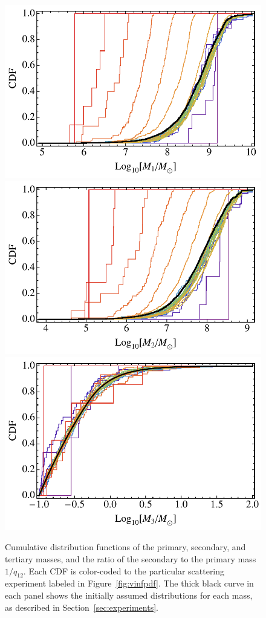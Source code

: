 \documentclass[a4paper,twocolumn]{emulateapj}
\begin{document}
{\begin{figure}
\centering\includegraphics[width=0.9\linewidth,clip=true]{m1CDF}\\
\includegraphics[width=0.9\linewidth,clip=true]{m2CDF}\\
\centering\includegraphics[width=0.9\linewidth,clip=true]{m3CDF}
\caption{Cumulative distribution functions of the primary, secondary, and tertiary masses, and the ratio of the secondary to the primary mass $1/q_{12}$. Each CDF is color-coded to the particular scattering experiment labeled in Figure~\ref{fig:vinfpdf}. The thick black curve in each panel shows the initially assumed distributions for each mass, as described in Section~\ref{sec:experiments}.}
\label{fig:mcdf}
\end{figure}

}
\end{document}
